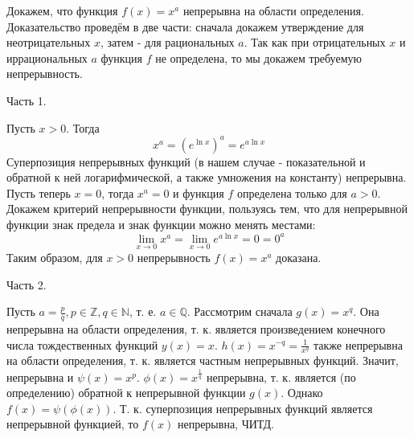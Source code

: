 \documentclass[a4paper]{article}
\begin{document}

Докажем, что функция $f(x)=x^a$ непрерывна на области определения. Доказательство проведём в две части: сначала докажем утверждение для неотрицательных $x$, затем - для рациональных $a$. Так как при отрицательных $x$ и иррациональных $a$ функция $f$ не определена, то мы докажем требуемую непрерывность.

Часть 1.

Пусть $x>0$. Тогда
$$
x^a=\left(e^{\ln x}\right)^a=e^{a \ln x}
$$
Суперпозиция непрерывных функций (в нашем случае - показательной и обратной к ней логарифмической, а также умножения на константу) непрерывна. Пусть теперь $x=0$, тогда $x^a=0$ и функция $f$ определена только для $a>0$. Докажем критерий непрерывности функции, пользуясь тем, что для непрерывной функции знак предела и знак функции можно менять местами:
\[
\lim_{x \to 0}x^a=\lim_{x \to 0}e^{a \ln x}=0=0^a
\]
Таким образом, для $x>0$ непрерывность $f(x)=x^a$ доказана.

Часть 2.

Пусть $a=\frac{p}{q}, p \in \mathbb{Z}, q \in \mathbb{N}$, т. е. $a \in \mathbb{Q}$.
Рассмотрим сначала $g(x)=x^q$. Она непрерывна на области определения, т. к. является произведением конечного числа тождественных функций $y(x)=x$. $h(x)=x^{-q}=\frac{1}{x^q}$ также непрерывна на области определения, т. к. является частным непрерывных функций. Значит, непрерывна и $\psi(x)=x^p$. $\phi(x)=x^\frac{1}{q}$ непрерывна, т. к. является (по определению) обратной к непрерывной функции $g(x)$. Однако $f(x)=\psi(\phi(x))$.
Т. к. суперпозиция непрерывных функций является непрерывной функцией, то $f(x)$ непрерывна, ЧИТД.
\end{document}
